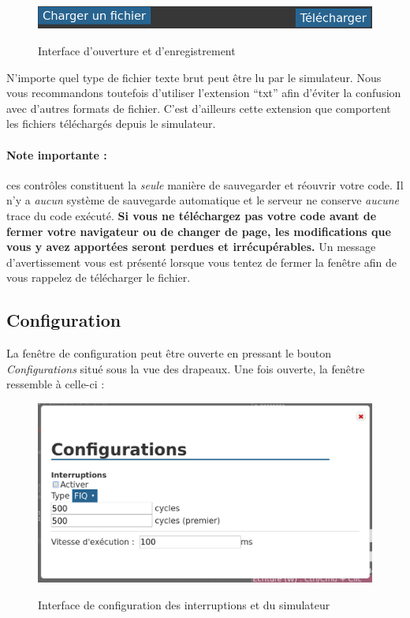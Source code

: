 \documentclass{tufte-handout}
\begin{document}
\begin{figure}[h!]
\raggedleft
\includegraphics[width=0.9\linewidth]{pics/opensave.png}
\label{f:opensave}
\caption{Interface d'ouverture et d'enregistrement}
\end{figure}

N'importe quel type de fichier texte brut peut être lu par le simulateur. Nous vous recommandons toutefois d'utiliser l'extension ``txt'' afin d'éviter la confusion avec d'autres formats de fichier. C'est d'ailleurs cette extension que comportent les fichiers téléchargés depuis le simulateur.

\paragraph{\textbf{Note importante :}} ces contrôles constituent la \emph{seule} manière de sauvegarder et réouvrir votre code. Il n'y a \emph{aucun} système de sauvegarde automatique et le serveur ne conserve \emph{aucune} trace du code exécuté. \textbf{Si vous ne téléchargez pas votre code avant de fermer votre navigateur ou de changer de page, les modifications que vous y avez apportées seront perdues et irrécupérables.} Un message d'avertissement vous est présenté lorsque vous tentez de fermer la fenêtre afin de vous rappelez de télécharger le fichier.

\clearpage
\subsection{Configuration}

La fenêtre de configuration peut être ouverte en pressant le bouton \textit{Configurations} situé sous la vue des drapeaux. Une fois ouverte, la fenêtre ressemble à celle-ci :
\begin{figure}[h!]
\raggedleft
\includegraphics[width=0.9\linewidth]{pics/configurations.png}
\label{f:config}
\caption{Interface de configuration des interruptions et du simulateur}
\end{figure}
\end{document}
